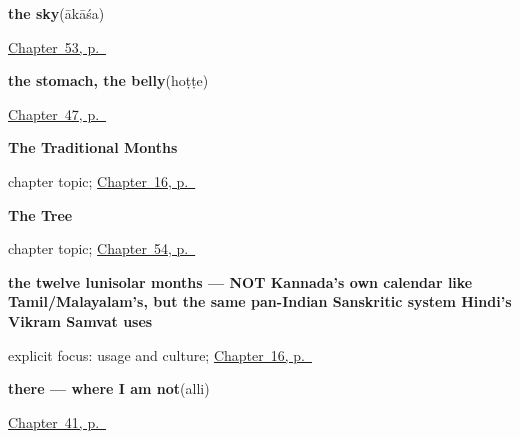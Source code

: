 \noindent\begin{minipage}[t]{\linewidth}
\raggedright
\textbf{the sky}\enspace\emph{}\enspace(ākāśa)\par
\footnotesize \hyperref[ch:ka-sky]{Chapter~53, p.~\pageref*{ch:ka-sky}}
\end{minipage}\par\smallskip

\noindent\begin{minipage}[t]{\linewidth}
\raggedright
\textbf{the stomach, the belly}\enspace\emph{}\enspace(hoṭṭe)\par
\footnotesize \hyperref[ch:ka-body-more]{Chapter~47, p.~\pageref*{ch:ka-body-more}}
\end{minipage}\par\smallskip

\noindent\begin{minipage}[t]{\linewidth}
\raggedright
\textbf{The Traditional Months}\par
\footnotesize chapter topic; \hyperref[ch:ka-traditional-months]{Chapter~16, p.~\pageref*{ch:ka-traditional-months}}
\end{minipage}\par\smallskip

\noindent\begin{minipage}[t]{\linewidth}
\raggedright
\textbf{The Tree}\par
\footnotesize chapter topic; \hyperref[ch:ka-tree]{Chapter~54, p.~\pageref*{ch:ka-tree}}
\end{minipage}\par\smallskip

\noindent\begin{minipage}[t]{\linewidth}
\raggedright
\textbf{the twelve lunisolar months — NOT Kannada's own calendar like Tamil/Malayalam's, but the same pan-Indian Sanskritic system Hindi's Vikram Samvat uses}\enspace\emph{           }\par
\footnotesize explicit focus: usage and culture; \hyperref[ch:ka-traditional-months]{Chapter~16, p.~\pageref*{ch:ka-traditional-months}}
\end{minipage}\par\smallskip

\noindent\begin{minipage}[t]{\linewidth}
\raggedright
\textbf{there — where I am not}\enspace\emph{}\enspace(alli)\par
\footnotesize \hyperref[ch:kn-pointing-and-asking]{Chapter~41, p.~\pageref*{ch:kn-pointing-and-asking}}
\end{minipage}\par\smallskip

